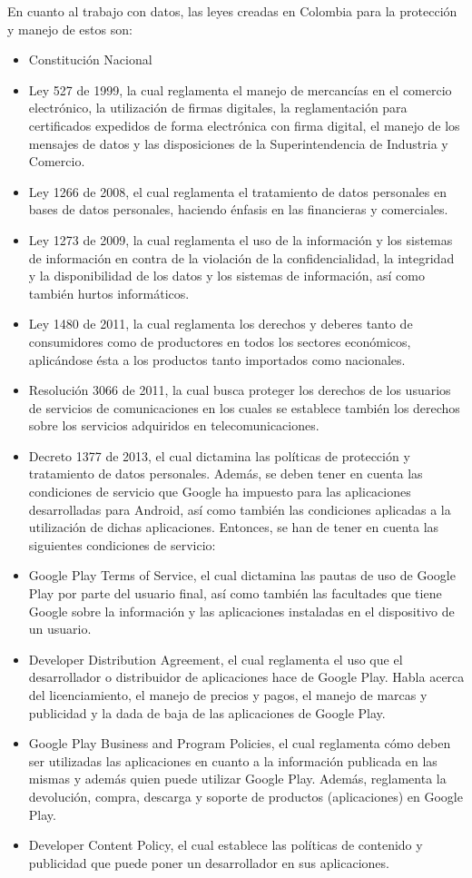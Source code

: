 En cuanto al trabajo con datos, las leyes creadas en Colombia para la protección y manejo de estos son:
\begin{itemize}
  \item Constitución Nacional
  \item Ley 527 de 1999, la cual reglamenta el manejo de mercancías en el comercio electrónico, la utilización de firmas digitales, la
reglamentación para certificados expedidos de forma electrónica con firma digital, el manejo de los mensajes de datos y las
disposiciones de la Superintendencia de Industria y Comercio.
  \item Ley 1266 de 2008, el cual reglamenta el tratamiento de datos personales en bases de datos personales, haciendo énfasis en las
financieras y comerciales.
  \item Ley 1273 de 2009, la cual reglamenta el uso de la información y los sistemas de información en contra de la violación de la
confidencialidad, la integridad y la disponibilidad de los datos y los sistemas de información, así como también hurtos informáticos.
  \item Ley 1480 de 2011, la cual reglamenta los derechos y deberes tanto de consumidores como de productores en todos los sectores
económicos, aplicándose ésta a los productos tanto importados como nacionales.
  \item Resolución 3066 de 2011, la cual busca proteger los derechos de los usuarios de servicios de comunicaciones en los cuales se
establece también los derechos sobre los servicios adquiridos en telecomunicaciones.
  \item Decreto 1377 de 2013, el cual dictamina las políticas de protección y tratamiento de datos personales.
Además, se deben tener en cuenta las condiciones de servicio que Google ha impuesto para las aplicaciones desarrolladas para Android, así
como también las condiciones aplicadas a la utilización de dichas aplicaciones. Entonces, se han de tener en cuenta las siguientes
condiciones de servicio:
  \item Google Play Terms of Service, el cual dictamina las pautas de uso de Google Play por parte del usuario final, así como también las
facultades que tiene Google sobre la información y las aplicaciones instaladas en el dispositivo de un usuario.
  \item Developer Distribution Agreement, el cual reglamenta el uso que el desarrollador o distribuidor de aplicaciones hace de Google Play.
Habla acerca del licenciamiento, el manejo de precios y pagos, el manejo de marcas y publicidad y la dada de baja de las aplicaciones
de Google Play.
  \item Google Play Business and Program Policies, el cual reglamenta cómo deben ser utilizadas las aplicaciones en cuanto a la información
publicada en las mismas y además quien puede utilizar Google Play. Además, reglamenta la devolución, compra, descarga y soporte
de productos (aplicaciones) en Google Play.
  \item Developer Content Policy, el cual establece las políticas de contenido y publicidad que puede poner un desarrollador en sus
aplicaciones.
\end{itemize}
